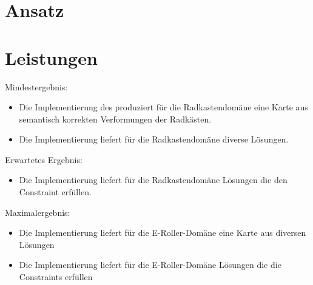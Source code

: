 \documentclass[12pt]{article}
\begin{document}
\section{Ansatz}


\section{Leistungen}
Mindestergebnis:
\begin{itemize}  
\item Die Implementierung des produziert für die Radkastendomäne eine Karte aus semantisch korrekten Verformungen der Radkästen.
\item Die Implementierung liefert für die Radkastendomäne diverse Lösungen.
\end{itemize}
Erwartetes Ergebnis:
\begin{itemize}  
\item  Die Implementierung liefert für die Radkastendomäne Lösungen die den Constraint erfüllen.
\end{itemize}
Maximalergebnis:
\begin{itemize}  
\item Die Implementierung liefert für die E-Roller-Domäne eine Karte aus diversen Lösungen
\item Die Implementierung liefert für die E-Roller-Domäne Lösungen die die Constraints erfüllen
\end{itemize}

\newpage{}

\end{document}
